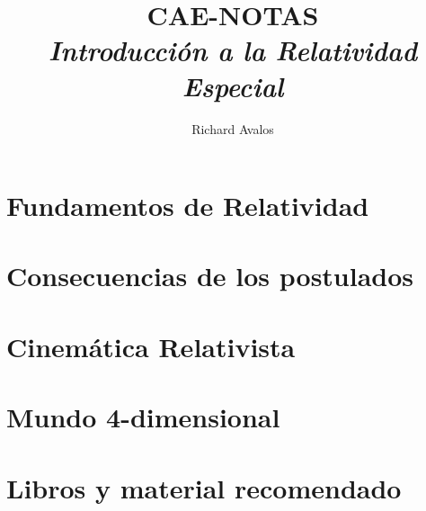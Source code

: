 \documentclass[10pt]{article}
\begin{document}
	\title{{CAE-NOTAS}\\{\normalsize{\itshape Introducción a la Relatividad Especial}}}
	\author{Richard Avalos}
	\maketitle
	\newpage
 
	\pagestyle{fancynotes}

        \part{Fundamentos de Relatividad}
        

        \part{Consecuencias de los postulados}\label{Part:ConsecPostulados}
        

        \part{Cinemática Relativista}\label{Part:CineRel}
        

        \part{Mundo 4-dimensional}\label{Part:4-dim}
        

        \newpage

        \part*{Libros y material recomendado}
        
        
\end{document}
